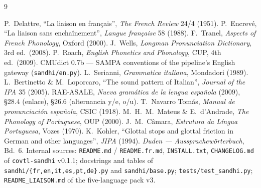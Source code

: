\documentclass[11pt,a4paper]{report}
\newcommand{\smp}[1]{\texttt{#1}}          %
\newcommand{\pkg}{\texttt{covtl-sandhi}}
\begin{document}
\begin{thebibliography}{9}

\small
{} P.~Delattre, ``La liaison en fran\c{c}ais'',
  \emph{The French Review} 24/4 (1951).
 P.~Encrev\'e, ``La liaison sans encha\^inement'',
  \emph{Langue fran\c{c}aise} 58 (1988).
 F.~Tranel, \emph{Aspects of French Phonology}, Oxford (2000).
 J.~Wells, \emph{Longman Pronunciation Dictionary}, 3rd ed.\ (2008).
 P.~Roach, \emph{English Phonetics and Phonology}, CUP, 4th ed.\ (2009).
 CMUdict 0.7b — SAMPA conventions of the pipeline's
  English gateway (\smp{sandhi/en.py}).
 L.~Serianni, \emph{Grammatica italiana}, Mondadori (1989).
 L.~Bertinetto \& M.~Loporcaro, ``The sound pattern of
  Italian'', \emph{Journal of the IPA} 35 (2005).
 RAE-ASALE, \emph{Nueva gram\'atica de la lengua espa\~nola}
  (2009), \S28.4 (enlace), \S26.6 (alternancia y/e, o/u).
 T.~Navarro Tom\'as, \emph{Manual de pronunciaci\'on
  espa\~nola}, CSIC (1918).
 M.~H.~M.~Mateus \& E.~d'Andrade, \emph{The Phonology of
  Portuguese}, OUP (2000).
 J.~M.~C\^amara, \emph{Estrutura da L\'ingua Portuguesa},
  Vozes (1970).
 K.~Kohler, ``Glottal stops and glottal friction in German
  and other languages'', \emph{JIPA} (1994).
 \emph{Duden — Aussprachew\"orterbuch}, Bd.~6.
 Internal sources: \smp{README.md} / \smp{README.fr.md},
  \smp{INSTALL.txt}, \smp{CHANGELOG.md} of \pkg{} v0.1.1; docstrings and
  tables of \smp{sandhi/\{fr,en,it,es,pt,de\}.py} and \smp{sandhi/base.py};
  \smp{tests/test\_sandhi.py}; \smp{README\_LIAISON.md} of the five-language
  pack v3.

\end{thebibliography}
\end{document}
